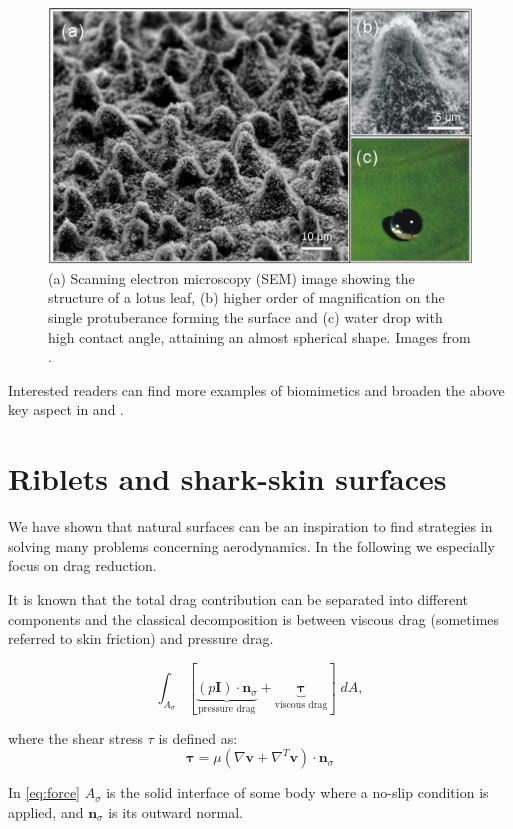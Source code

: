 \begin{figure}[h]
	\centering
	\includegraphics[width=0.6\linewidth]{chapter_1/lotus}
	\caption{(a) Scanning electron microscopy (SEM) image showing the structure of a lotus leaf, (b) higher order of magnification on the single protuberance forming the surface and (c) water drop with high contact angle, attaining an almost spherical shape. Images from \citet{stratakis2009laser}.}
	\label{fig:lotus}
\end{figure}

Interested readers can find more examples of biomimetics and broaden the above key aspect in \citet{bhushan2016biomimetics} and \citet{tropea2012nature}.

\section{Riblets and shark-skin surfaces}
We have shown that natural surfaces can be an inspiration to find strategies in solving many problems concerning aerodynamics. In the following we especially focus on drag reduction.

It is known that the total drag contribution can be separated into different components and the classical decomposition is between viscous drag (sometimes referred to skin friction) and pressure drag.

\begin{equation}
 \int_{A_{\sigma}}  [ \underbrace{\left({p} \mathbf{I} \right) \cdot  \mathbf{n}_{\sigma} }_\text{pressure drag}  +  \underbrace{\boldsymbol{\tau}}_\text{viscous drag} ] \; dA,
 \label{eq:force}
\end{equation}

where the shear stress $\tau$ is defined as:
$$
\boldsymbol{\tau} = \mu \left( \nabla \mathbf{v} +  \nabla^T \mathbf{v} \right) \cdot  \mathbf{n}_{\sigma}
$$

In \eqref{eq:force} $A_{\sigma}$ is the solid interface of some body where a no-slip condition is applied, and $ \mathbf{n}_{\sigma}$ is its outward normal.

